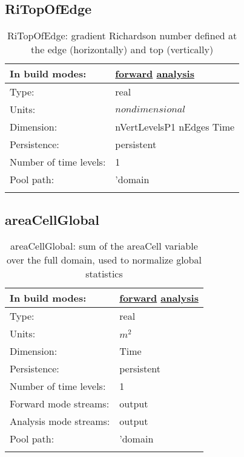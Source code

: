 \subsection[RiTopOfEdge]{RiTopOfEdge}
\label{subsec:var_sec_diagnostics_RiTopOfEdge}
\begin{center}
\begin{longtable}{| p{2.0in} | p{4.0in} |}
        \hline 
        In build modes: & \hyperref[subsec:forward_var_tab_diagnostics]{forward} \hyperref[subsec:analysis_var_tab_diagnostics]{analysis} \\
        \hline 
        Type: & real \\
        \hline 
        Units: & $nondimensional$ \\
        \hline 
        Dimension: & nVertLevelsP1 nEdges Time \\
        \hline 
        Persistence: & persistent \\
        \hline 
        Number of time levels: & 1 \\
        \hline 
            Pool path: & 'domain %
 \\
		 \hline 
    \caption{RiTopOfEdge: gradient Richardson number defined at the edge (horizontally) and top (vertically)}
\end{longtable}
\end{center}
\subsection[areaCellGlobal]{areaCellGlobal}
\label{subsec:var_sec_diagnostics_areaCellGlobal}
\begin{center}
\begin{longtable}{| p{2.0in} | p{4.0in} |}
        \hline 
        In build modes: & \hyperref[subsec:forward_var_tab_diagnostics]{forward} \hyperref[subsec:analysis_var_tab_diagnostics]{analysis} \\
        \hline 
        Type: & real \\
        \hline 
        Units: & $m^2$ \\
        \hline 
        Dimension: & Time \\
        \hline 
        Persistence: & persistent \\
        \hline 
        Number of time levels: & 1 \\
        \hline 
		 Forward mode streams: &  output \\
        \hline 
		 Analysis mode streams: &  output \\
        \hline 
            Pool path: & 'domain %
 \\
		 \hline 
    \caption{areaCellGlobal: sum of the areaCell variable over the full domain, used to normalize global statistics}
\end{longtable}
\end{center}
